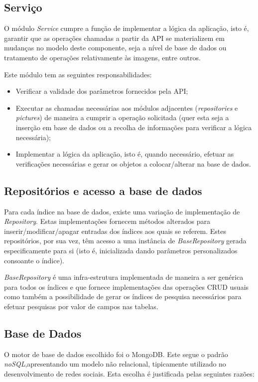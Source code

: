 \newpage

\subsection{Serviço}
O módulo \textit{Service} cumpre a função de implementar a lógica da aplicação, isto é, garantir que as operações chamadas a partir da API se materializem em mudanças no modelo deste componente, seja a nível de base de dados ou tratamento de operações relativamente às imagens, entre outros. \par \medskip

Este módulo tem as seguintes responsabilidades:
\begin{itemize}
	\item Verificar a validade dos parâmetros fornecidos pela API;
	\item Executar as chamadas necessárias aos módulos adjacentes (\textit{repositories} e \textit{pictures}) de maneira a cumprir a operação solicitada (quer esta seja a inserção em base de dados ou a recolha de informações para verificar a lógica necessária);
	\item Implementar a lógica da aplicação, isto é, quando necessário, efetuar as verificações necessárias e gerar os objetos a colocar/alterar na base de dados.
\end{itemize}

\subsection{Repositórios e acesso a base de dados}
Para cada índice na base de dados, existe uma variação de implementação de \textit{Repository}. Estas implementações fornecem métodos alterados para inserir/modificar/apagar entradas dos índices aos quais se referem. Estes repositórios, por sua vez, têm acesso a uma instância de \textit{BaseRepository} gerada especificamente para si (isto é, inicializada dando parâmetros personalizados consoante o índice). \par \medskip

\textit{BaseRepository} é uma infra-estrutura implementada de maneira a ser genérica para todos os índices e que fornece implementações das operações CRUD usuais como também a possibilidade de gerar os índices de pesquisa necessários para efetuar pesquisas por valor de campos nas tabelas. \par \medskip

\subsection{Base de Dados}
O motor de base de dados escolhido foi o MongoDB. Este segue o padrão \textit{noSQL},apresentando um modelo não relacional, tipicamente utilizado no desenvolvimento de redes sociais. Esta escolha é justificada pelas seguintes razões:

